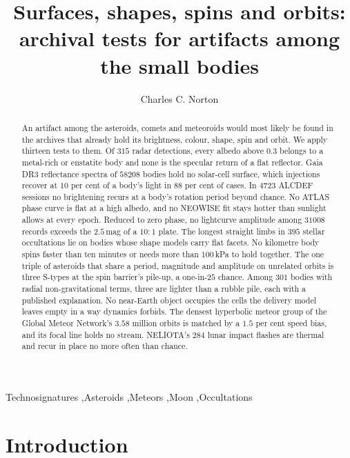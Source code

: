 \documentclass[3p,11pt]{elsarticle}
\begin{document}
\begin{frontmatter}

\title{Surfaces, shapes, spins and orbits: archival tests for artifacts among the small bodies}

\author{Charles C. Norton}

\begin{abstract}
An artifact among the asteroids, comets and meteoroids would most likely be found in the
archives that already hold its brightness, colour, shape, spin and orbit. We apply
thirteen tests to them. Of $315$ radar detections, every albedo above $0.3$ belongs to
a metal-rich or enstatite body and none is the specular return of a flat reflector.
Gaia DR3 reflectance spectra of $58208$ bodies hold no solar-cell surface, which
injections recover at $10$ per cent of a body's light in $88$ per cent of cases. In
$4723$ ALCDEF sessions no brightening recurs at a body's rotation period beyond chance.
No ATLAS phase curve is flat at a high albedo, and no NEOWISE fit stays hotter than
sunlight allows at every epoch. Reduced to zero phase, no lightcurve amplitude among
$31008$ records exceeds the $2.5$\,mag of a $10:1$ plate. The longest straight limbs in
$395$ stellar occultations lie on bodies whose shape models carry flat facets. No
kilometre body spins faster than ten minutes or needs more than $100$\,kPa to hold
together. The one triple of asteroids that share a period, magnitude and amplitude on
unrelated orbits is three S-types at the spin barrier's pile-up, a one-in-$25$ chance.
Among $301$ bodies with radial non-gravitational terms, three are lighter than a rubble
pile, each with a published explanation. No near-Earth object occupies the cells the
delivery model leaves empty in a way dynamics forbids. The densest hyperbolic meteor
group of the Global Meteor Network's $3.58$ million orbits is matched by a $1.5$ per
cent speed bias, and its focal line holds no stream. NELIOTA's $284$ lunar impact
flashes are thermal and recur in place no more often than chance.
\end{abstract}

\begin{keyword}
Technosignatures \sep Asteroids \sep Meteors \sep Moon \sep Occultations
\end{keyword}

\end{frontmatter}

\section{Introduction}\label{sec:intro}
\end{document}
